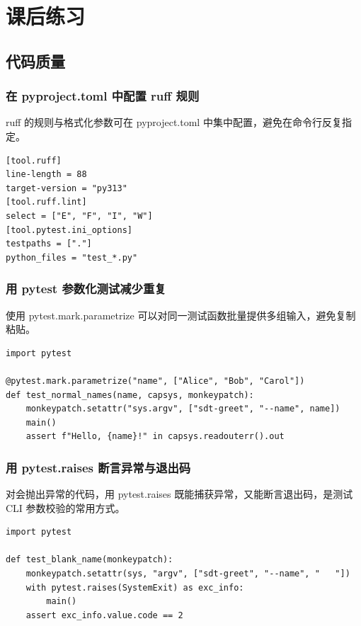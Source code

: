\section{课后练习}

\subsection{代码质量}

\subsubsection{在 pyproject.toml 中配置 ruff 规则}
ruff 的规则与格式化参数可在 pyproject.toml 中集中配置，避免在命令行反复指定。
\begin{verbatim}
[tool.ruff]
line-length = 88
target-version = "py313"
[tool.ruff.lint]
select = ["E", "F", "I", "W"]
[tool.pytest.ini_options]
testpaths = ["."]
python_files = "test_*.py"
\end{verbatim}

\subsubsection{用 pytest 参数化测试减少重复}
使用 pytest.mark.parametrize 可以对同一测试函数批量提供多组输入，避免复制粘贴。
\begin{verbatim}
import pytest

@pytest.mark.parametrize("name", ["Alice", "Bob", "Carol"])
def test_normal_names(name, capsys, monkeypatch):
    monkeypatch.setattr("sys.argv", ["sdt-greet", "--name", name])
    main()
    assert f"Hello, {name}!" in capsys.readouterr().out
\end{verbatim}

\subsubsection{用 pytest.raises 断言异常与退出码}
对会抛出异常的代码，用 pytest.raises 既能捕获异常，又能断言退出码，是测试 CLI 参数校验的常用方式。
\begin{verbatim}
import pytest

def test_blank_name(monkeypatch):
    monkeypatch.setattr(sys, "argv", ["sdt-greet", "--name", "   "])
    with pytest.raises(SystemExit) as exc_info:
        main()
    assert exc_info.value.code == 2
\end{verbatim}

